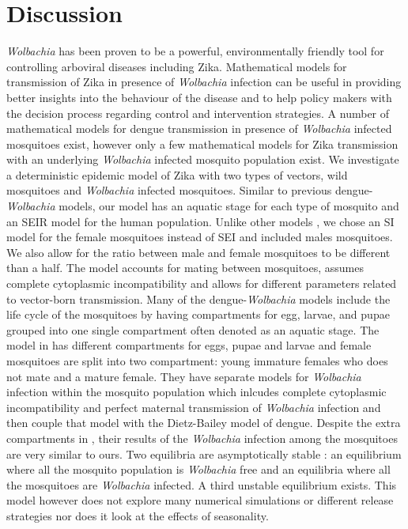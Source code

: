 \documentclass{ws-rv9x6}
\begin{document}
\section{Discussion}
\textit{Wolbachia} has been proven to be a powerful, environmentally friendly tool for controlling arboviral diseases including Zika. Mathematical models for transmission of Zika in presence of \textit{Wolbachia} infection can be useful in providing better insights into the behaviour of the disease and to help policy makers with the decision process regarding control and intervention strategies. A number of mathematical models for dengue transmission in presence of \textit{Wolbachia} infected mosquitoes exist, however only a few mathematical models for Zika transmission with an underlying \textit{Wolbachia} infected mosquito population exist. 
 We investigate a deterministic epidemic model of Zika with two types of vectors, wild mosquitoes and \textit{Wolbachia} infected mosquitoes. Similar to previous dengue-\textit{Wolbachia} models, our model has an aquatic stage for each type of mosquito and an SEIR model for the human population. Unlike other models \cite{ndii2015modelling}, we chose an SI model for the female mosquitoes instead of SEI and included males mosquitoes. We also allow for the ratio between male and female mosquitoes to be different than a half. The model accounts for mating between mosquitoes, assumes complete cytoplasmic incompatibility and allows for different parameters related to vector-born transmission. Many of the dengue-\textit{Wolbachia} models include the life cycle of the mosquitoes by having compartments for egg, larvae, and pupae grouped into one single compartment often denoted as an aquatic stage. The model in \cite{koiller2014aedes} has different compartments for eggs, pupae and larvae and female mosquitoes are split into two compartment: young immature females who does not mate and a mature female. They have separate models for \textit{Wolbachia} infection within the mosquito population which inlcudes complete cytoplasmic incompatibility and perfect maternal transmission of \textit{Wolbachia} infection and then couple that model with the Dietz-Bailey model of dengue. Despite the extra compartments in \cite{koiller2014aedes}, their results of the \textit{Wolbachia} infection among the mosquitoes are very similar to ours. Two equilibria are asymptotically
stable : an equilibrium where all the mosquito population is \textit{Wolbachia} free and an equilibria where all the
mosquitoes are \textit{Wolbachia} infected. A third unstable equilibrium exists. This model however does not explore many numerical simulations or different release strategies nor does it look at the effects of seasonality. 
\end{document}
